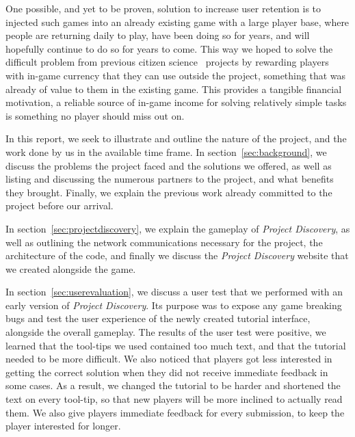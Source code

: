 One possible, and yet to be proven, solution to increase user retention is to injected such games into an already existing game with a large player base, where people are returning daily to play, have been doing so for years, and will hopefully continue to do so for years to come. This way we hoped to solve the difficult problem from previous citizen science~\cite{citizenscience} projects by rewarding 
players with in-game currency that they can use outside the project, something that was already of value to them in the existing game. This provides a tangible financial motivation, a reliable source of in-game income for solving relatively simple tasks is something no player should miss out on.


In this report, we seek to illustrate and outline the nature of the project, and the work done by us in the available time frame. In section~\ref{sec:background}, we discuss the problems the project faced and the solutions we offered, as well as listing and discussing the numerous partners to the project, and what benefits they brought. Finally, we explain the previous work already committed to the project before our arrival.

In section~\ref{sec:projectdiscovery}, we explain the gameplay of \emph{Project Discovery}, as well as outlining the network communications necessary for the project, the architecture of the code, and finally we discuss the \emph{Project Discovery} website that we created alongside the game. 

In section~\ref{sec:userevaluation}, we discuss a user test that we performed with an early version of \emph{Project Discovery}. Its purpose was to expose any game breaking bugs and test the user experience of the newly created tutorial interface, alongside the overall gameplay. The results of the user test were positive, we learned that the tool-tips we used contained too much text, and that the tutorial needed to be more difficult. We also noticed that players got less interested in getting the correct solution when they did not receive immediate feedback in some cases. As a result, we changed the tutorial to be harder and shortened the text on every tool-tip, so that new players will be more inclined to actually read them. We also give players immediate feedback for every submission, to keep the player interested for longer.

